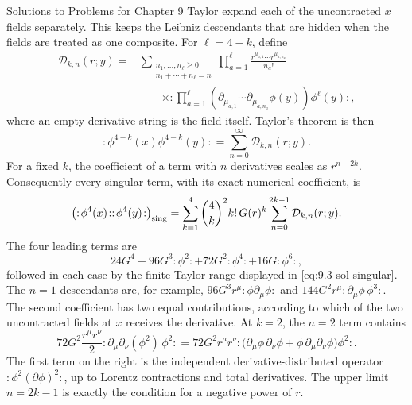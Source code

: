 \begin{bankssolutions}{Solutions to Problems for Chapter 9}
Taylor expand each of the uncontracted $x$ fields separately.  This keeps the
Leibniz descendants that are hidden when the fields are treated as one
composite.  For $\ell=4-k$, define
\begin{align*}
 \mathcal D_{k,n}(r;y)={}&
 \sum_{\substack{n_1,\ldots,n_\ell\geq0\\
                       n_1+\cdots+n_\ell=n}}
 \prod_{a=1}^{\ell}
 \frac{r^{\mu_{a,1}}\cdots r^{\mu_{a,n_a}}}{n_a!}\\[-2pt]
 &\qquad\times
 :\!\prod_{a=1}^{\ell}
 \left(\partial_{\mu_{a,1}}\cdots
       \partial_{\mu_{a,n_a}}\phi(y)\right)\phi^\ell(y)\!:,
 \end{align*}
where an empty derivative string is the field itself.  Taylor's theorem is
then
\[
 :\!\phi^{4-k}(x)\phi^{4-k}(y)\!:
 =\sum_{n=0}^{\infty}\mathcal D_{k,n}(r;y).
\]
For a fixed $k$, the coefficient of a term with $n$ derivatives scales as
$r^{n-2k}$. Consequently every singular term, with its exact numerical
coefficient, is
\begin{equation}
\begin{aligned}
 \bigl(:\!\phi^4(x)\!::\!\phi^4(y)\!:\bigr)_{\rm sing}
 =\sum_{k=1}^{4}\binom4k^2 k!\,G(r)^k
 \sum_{n=0}^{2k-1}\mathcal D_{k,n}(r;y).
\end{aligned}
 \label{eq:9.3-sol-singular}
 \end{equation}
The four leading terms are
\[
 24G^4+96G^3:\!\phi^2\!:
 +72G^2:\!\phi^4\!:+16G:\!\phi^6\!:,
\]
 followed in each case by the finite Taylor range displayed in
 \eqref{eq:9.3-sol-singular}.  The $n=1$ descendants are, for example,
 $96G^3r^\mu:\!\phi\partial_\mu\phi\!:$ and
 $144G^2r^\mu:\!\partial_\mu\phi\,\phi^3\!:$.  The second coefficient has
 two equal contributions, according to which of the two uncontracted fields
 at $x$ receives the derivative.  At $k=2$, the $n=2$
 term contains
 \[
 72G^2\frac{r^\mu r^\nu}{2}
 :\!\partial_\mu\partial_\nu(\phi^2)\,\phi^2\!:
 =72G^2r^\mu r^\nu
 :\!\bigl(\partial_\mu\phi\,\partial_\nu\phi
 +\phi\,\partial_\mu\partial_\nu\phi\bigr)\phi^2\!: .
 \]
The first term on the right is the independent derivative-distributed
operator $:\!\phi^2(\partial\phi)^2\!:$, up to Lorentz contractions and
total derivatives.  The upper limit $n=2k-1$ is exactly the condition for a
negative power of $r$.


\end{bankssolutions}
